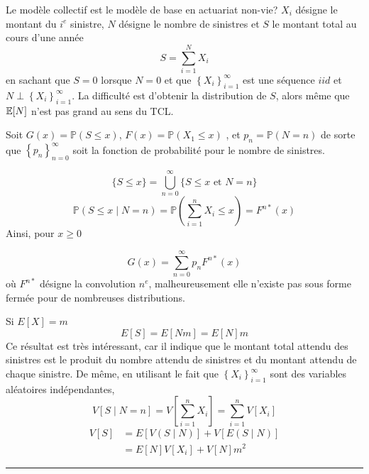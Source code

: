\begin{f}
Le modèle collectif est le modèle de base en actuariat non-vie?
	 \(X_{i}\) désigne le montant du \(i^e\) sinistre, \(N\) désigne le nombre de sinistres et \(S\) le montant total au cours d'une année
	\[
	S=\sum_{i=1}^{N} X_{i}
	\]
	en sachant que \(S=0\) lorsque \(N=0 \) et que \(\left\{X_{i}\right\}_{i=1}^{\infty}\) est une séquence \(iid\) et  \(N \perp \left\{X_{i}\right\}_{i=1}^{\infty}\). 
La difficulté est d'obtenir la distribution de \(S\), alors même que \(\mathbb{E} [N]\) n'est pas grand au sens du TCL.
\end{f}


\begin{f}[La distribution de \(S\)]
	
Soit \(G(x)=\mathbb{P}(S \leq x)\), \(F(x)=\mathbb{P}\left(X_{1} \leq x\right)\) , et \(p_{n}=\mathbb{P}(N=n)\) de sorte que \(\left\{p_{n}\right\}_{n=0}^{\infty}\) soit la fonction de probabilité pour le nombre de sinistres.
	
	\[
	\{S \leq x\}=\bigcup_{n=0}^{\infty}\{S \leq x \text { et } N=n\}
	\]
	\[
	\mathbb{P}(S \leq x \mid N=n)=\mathbb{P}\left(\sum_{i=1}^{n} X_{i} \leq x\right)=F^{n *}(x)
	\]
	Ainsi, pour \(x \geq 0\)
	
	\begin{equation*}\label{GxCollectif}
		G(x)=\sum_{n=0}^{\infty} p_{n} F^{n *}(x)
	\end{equation*}
	où \(F^{n *}\) désigne la convolution \(n^e\), malheureusement elle n'existe pas sous forme fermée pour de nombreuses distributions.	
	
Si \(E[X]=m\)
	\[
	E[S]=E\left[N m\right]=E[N] m
	\]
	Ce résultat est très intéressant, car il indique que le montant total attendu des sinistres est le produit du nombre attendu de sinistres et du montant attendu de chaque sinistre. De même, en utilisant le fait que \(\left\{X_{i}\right\}_{i=1}^{\infty}\) sont des variables aléatoires indépendantes,
	\[
	V[S \mid N=n]=V\left[\sum_{i=1}^{n} X_{i}\right]=\sum_{i=1}^{n} V\left[X_{i}\right]
	\]
	\[
	\begin{aligned}
		V[S] &=E[V(S \mid N)]+V[E(S \mid N)] \\
		&=E[N] V\left[X_{i}\right]+V[N] m^{2}
	\end{aligned}
	\]    
\end{f}

\hrule


